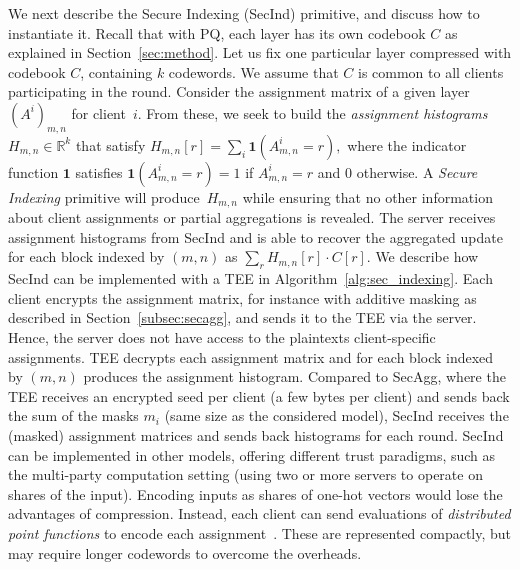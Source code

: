 \documentclass[11pt]{article}
\newcommand{\SecInd}{{\sc SecInd}\xspace}
\newcommand{\SecAgg}{{\sc SecAgg}\xspace}
\newcommand{\ilya}[1]{{\color{red}Ilya: #1}}
\begin{document}
We next describe the Secure Indexing (\SecInd) primitive, and discuss how to instantiate it.
Recall that with PQ, each layer has its own codebook $C$ as explained in Section~\ref{sec:method}.
Let us fix one particular layer compressed with codebook $C$, containing $k$ codewords.
We assume that $C$ is common to all clients participating in the round.
Consider the assignment matrix of a given layer $(A^i)_{m,n}$ for client~$i$.
From these, we seek to build the \emph{assignment histograms} $H_{m,n} \in \mathbb R^k$ that satisfy
$H_{m,n}[r] = \sum_i \mathbf 1\left(A^i_{m,n} = r\right),$
where the indicator function $\mathbf 1$ satisfies $\mathbf 1\left(A^i_{m,n} = r\right) = 1$ if $A^i_{m,n} = r$ and $0$ otherwise.
A \emph{Secure Indexing} primitive will produce~$H_{m,n}$ while ensuring that no other information about client assignments or partial aggregations is revealed.
The server receives assignment histograms from \SecInd and is able to recover the aggregated update for each block indexed by $(m, n)$ as
$
        \sum_r  H_{m,n}[r] \cdot C[r].
$
%
We describe how \SecInd can be implemented with a TEE in Algorithm~\ref{alg:sec_indexing}.
Each client encrypts the assignment matrix, for instance with additive masking as described in Section~\ref{subsec:secagg}, and sends it to the TEE via the server.
Hence, the server does not have access to the plaintexts client-specific assignments.
TEE decrypts each assignment matrix and for each block indexed by $(m, n)$ produces the assignment histogram.
Compared to \SecAgg, where the TEE receives an encrypted seed per client (a few bytes per client) and sends back the sum of the masks $m_i$ (same size as the considered model), \SecInd receives the (masked) assignment matrices and sends back histograms for each round.
\SecInd can be implemented in other models, offering different trust paradigms,
such as the multi-party computation setting (using two or more servers to operate on shares of the input).
Encoding inputs as shares of one-hot vectors would lose the advantages of compression.
Instead, each client can send evaluations of \emph{distributed point functions} to encode each assignment~\cite{Graham-boyle16}.
These are represented compactly, but may require longer codewords to overcome the overheads.
\end{document}
